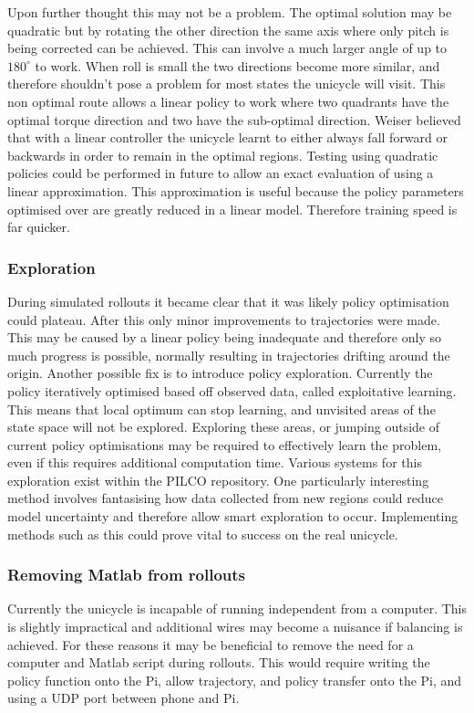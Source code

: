\documentclass[twoside,twocolumn,12pt]{article}
\begin{document}
Upon further thought this may not be a problem. The optimal solution may be quadratic but by rotating the other direction the same axis where only pitch is being corrected can be achieved. This can involve a much larger angle of up to $180^{\circ}$ to work. When roll is small the two directions become more similar, and therefore shouldn't pose a problem for most states the unicycle will visit. This non optimal route allows a linear policy to work where two quadrants have the optimal torque direction and two have the sub-optimal direction. Weiser believed that with a linear controller the unicycle learnt to either always fall forward or backwards in order to remain in the optimal regions. \cite{eric}
\newline
Testing using quadratic policies could be performed in future to allow an exact evaluation of using a linear approximation. This approximation is useful because the policy parameters optimised over are greatly reduced in a linear model. Therefore training speed is far quicker.
\subsubsection{Exploration}
During simulated rollouts it became clear that it was likely policy optimisation could plateau. After this only minor improvements to trajectories were made. This may be caused by a linear policy being inadequate and therefore only so much progress is possible, normally resulting in trajectories drifting around the origin.
\newline
Another possible fix is to introduce policy exploration. Currently the policy iteratively optimised based off observed data, called exploitative learning. This means that local optimum can stop learning, and unvisited areas of the state space will not be explored. Exploring these areas, or jumping outside of current policy optimisations may be required to effectively learn the problem, even if this requires additional computation time. 
\newline
Various systems for this exploration exist within the PILCO repository. One particularly interesting method involves fantasising how data collected from new regions could reduce model uncertainty and therefore allow smart exploration to occur. \cite{exp}
\newline
Implementing methods such as this could prove vital to success on the real unicycle.
\subsubsection{Removing Matlab from rollouts}
Currently the unicycle is incapable of running independent from a computer. This is slightly impractical and additional wires may become a nuisance if balancing is achieved. For these reasons it may be beneficial to remove the need for a computer and Matlab script during rollouts. This would require writing the policy function onto the Pi, allow trajectory, and policy transfer onto the Pi, and using a UDP port between phone and Pi.
\end{document}
